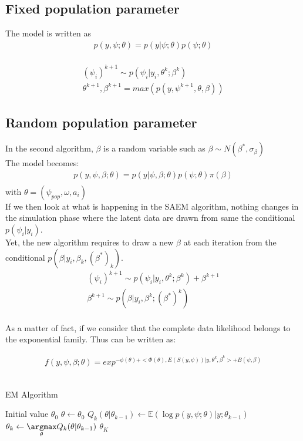 \documentclass[a4paper]{article}
\begin{document}
\subsection{Fixed population parameter}
The model is written as 
\begin{align}
 p(y,\psi;\theta) = p(y|\psi;\theta)p(\psi;\theta)
\end{align}\\
\begin{align}
 (\psi_i)^{k+1} \sim p(\psi_i| y_i,\theta^{k};\beta^{k})\\
 \theta^{k+1},\beta^{k+1} = max(p(y,\psi^{k+1},\theta,\beta))
\end{align}

\subsection{Random population parameter}
In the second algorithm, $\beta$ is a random variable such as $\beta \sim N(\beta^{*},\sigma_\beta)$\\
The model becomes:
\begin{align}
 p(y,\psi,\beta;\theta) = p(y|\psi,\beta;\theta)p(\psi;\theta)\pi(\beta)\\
\end{align}
with $\theta = (\psi_{pop}, \omega, a_i)$\\


If we then look at what is happening in the SAEM algorithm, nothing changes in the simulation phase where the latent data are drawn from same the conditional $p(\psi_i|y_i)$.\\
Yet, the new algorithm requires to draw a new $\beta$ at each iteration from the conditional $p(\beta|y_i,\beta_{k},(\beta^*)_{k})$.\\

\begin{align}
 (\psi_i)^{k+1} \sim p(\psi_i| y_i,\theta^{k};\beta^{k}) + \beta^{k+1}\\
 \beta^{k+1} \sim p(\beta| y_i,\beta^{k};(\beta^{*})^{k})
\end{align}\\

As a matter of fact, if we consider that the complete data likelihood belongs to the exponential family. Thus can be written as:

 \begin{align}
 f(y,\psi,\beta;\theta) = exp^{-\phi(\theta) + <\Phi(\theta),E(S(y,\psi))|y,\theta^k,\beta^k> + B(\psi,\beta) }
\end{align}\\





\begin{algorithm}
\caption{EM Algorithm}
\label{pseudoEM}
\begin{algorithmic}[1]
\State Initial value $\theta_0$
\State $\theta \gets \theta_0$
    \State $Q_k(\theta|\theta_{k-1}) \gets \mathbb{E}(\log p(y,\psi;\theta)|y;\theta_{k-1})$
    \State $\theta_k \gets \underset{\theta}{\argmax} Q_k(\theta|\theta_{k-1})$
\EndFor  
\State \Return $\theta_K$
\end{algorithmic}
\end{algorithm}
\end{document}
